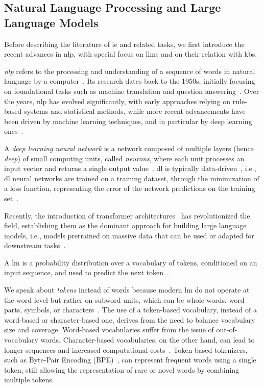 \subsection{Natural Language Processing and Large Language Models}
Before describing the literature of \ac{ie} and related tasks, we first introduce the recent advances in \ac{nlp}, with special focus on \acp{llm} and on their relation with \acp{kb}.

\emph{\Acf{nlp}} refers to the processing and understanding of a sequence of words in natural language by a computer~\cite{bates1995models}.
Its research dates back to the 1950s, initially focusing on foundational tasks such as machine translation and question answering~\cite{bates1995models}.
Over the years, \ac{nlp} has evolved significantly, with early approaches relying on rule-based systems and statistical methods, while more recent advancements have been driven by machine learning techniques, and in particular by deep learning ones~\cite{entityorientedsearch2018}.

A \emph{deep learning neural network} is a network composed of multiple layers (hence \emph{deep}) of small computing units, called \emph{neurons}, where each unit processes an input vector and returns a single output value~\cite{jm3}.
%
\Acf{dl} is typically data-driven~\cite{jm3}, i.e., \ac{dl} neural networks are trained on a training dataset, through the minimization of a loss function, representing the error of the network predictions on the training set~\cite{hastie2009elements}.

Recently, the introduction of transformer architectures~\cite{vaswani_transformers_2017} has revolutionized the field, establishing them as the dominant approach for building large language models, i.e., models pretrained on massive data that can be used or adapted for downstream tasks~\cite{gu2024mamba}.
\begin{definition}
     A \acf{lm} is a probability distribution over a vocabulary of tokens, conditioned on an input sequence, and used to predict the next token~\cite{lm_java_methods_2023,jm3}.
\end{definition}
We speak about \emph{tokens} instead of words because modern \ac{lm} do not operate at the word level but rather on subword units, which can be whole words, word parts, symbols, or characters~\cite{comprensive_overview_llm_2025}. The use of a token-based vocabulary, instead of a word-based or character-based one, derives from the need to balance vocabulary size and coverage. Word-based vocabularies suffer from the issue of out-of-vocabulary words. Character-based vocabularies, on the other hand, can lead to longer sequences and increased computational costs~\cite{sun-etal-2023-characters}. Token-based tokenizers, such as Byte-Pair Encoding (BPE)~\cite{sennrich-etal-2016-neural}, can represent frequent words using a single token, still allowing the representation of rare or novel words by combining multiple tokens.

